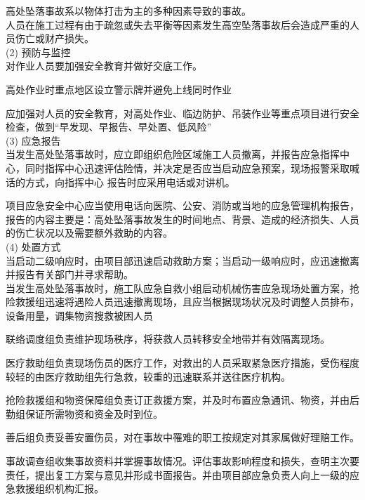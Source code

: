 高处坠落事故系以物体打击为主的多种因素导致的事故。\\

人员在施工过程有由于疏忽或失去平衡等因素发生高空坠落事故后会造成严重的人员伤亡或财产损失。\\

(2) 预防与监控\\

对作业人员要加强安全教育并做好交底工作。

高处作业时重点地区设立警示牌并避免上线同时作业

应加强对人员的安全教育，对高处作业、临边防护、吊装作业等重点项目进行安全检查，做到“早发现、早报告、早处置、低风险”\\

(3) 应急报告\\

当发生高处坠落事故时，应立即组织危险区域施工人员撤离，并报告应急指挥中心，同时指挥中心迅速评估险情，并决定是否应当启动应急预案，现场报警采取喊话的方式，向指挥中心
报告时应采用电话或对讲机。

项目应急安全中心应当使用电话向医院、公安、消防或当地的应急管理机构报告，报告的内容主要是：高处坠落事故发生的时间地点、背景、造成的经济损失、人员的伤亡状况以及需要额外救助的内容。\\

(4) 处置方式\\

当启动二级响应时，由项目部迅速启动救助方案；当启动一级响应时，应迅速撤离并报告有关部门并寻求帮助。\\

当发生高处坠落事故时，施工队应急自救小组启动机械伤害应急现场处置方案，抢险救援组迅速将遇险人员迅速撤离现场，且应当根据现场状况及时调整人员排布，设备用量，调集物资搜救被困人员

联络调度组负责维护现场秩序，将获救人员转移安全地带并有效隔离现场。

医疗救助组负责现场伤员的医疗工作，对救出的人员采取紧急医疗措施，受伤程度较轻的由医疗救助组先行急救，较重的迅速联系并送往医疗机构。

抢险救援组和物资保障组负责订正救援方案，并及时布置应急通讯、物资，并由后勤组保证所需物资和资金及时到位。

善后组负责妥善安置伤员，对在事故中罹难的职工按规定对其家属做好理赔工作。

事故调查组收集事故资料并掌握事故情况。评估事故影响程度和损失，查明主次要责任，提出复工方案与意见并形成书面报告。并由项目部应急负责人向上一级的应急救援组织机构汇报。\\

